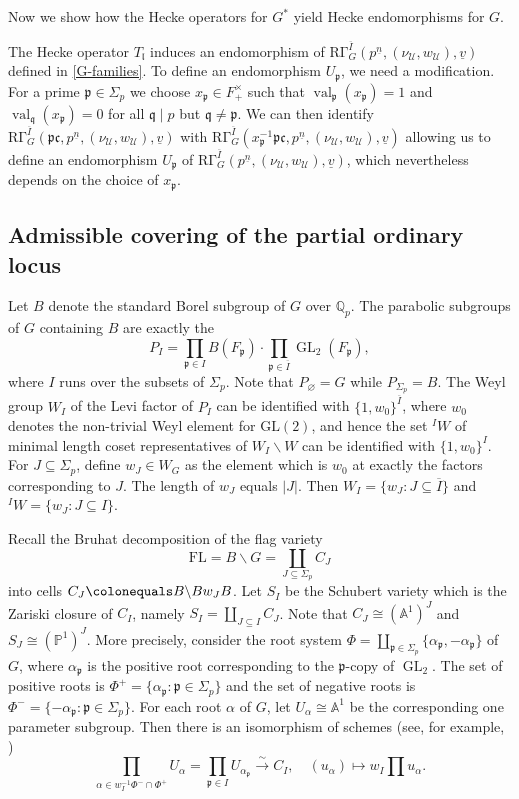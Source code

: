 \documentclass[11pt]{amsart}
\theoremstyle{definition} %
\theoremstyle{plain} %
\theoremstyle{remark} %
\renewcommand{\AA}{\mathbb A}
\newcommand{\PP}{{\mathbb P}}
\newcommand{\QQ}{{\mathbb Q}}
\newcommand{\cU}{{\mathcal U}}
\newcommand{\frakc}{\mathfrak c}
\newcommand{\frakl}{\mathfrak l}
\newcommand{\frakp}{\mathfrak p}
\newcommand{\frakq}{\mathfrak q}
\newcommand{\defeq}{\colonequals} %
\newcommand{\isom}{\cong} %
\DeclareMathOperator\GL{GL} %
\DeclareMathOperator\val{val} %
\newcommand{\RG}{\mathrm{R\Gamma}}
\begin{document}
Now we show how the Hecke operators for $G^\ast$ yield  Hecke endomorphisms for $G$.

The Hecke operator $T_\frakl$  induces an endomorphism of $\RG_G^{\overline{I}}(p^{\underline{n}},(\nu_\cU,w_\cU),\underline{v})$
defined in \eqref{G-families}. 
To define an  endomorphism $U_\frakp$, we need a modification.
For a prime $\frakp\in \Sigma_p$ we choose $x_\frakp\in F_+^{\times}$ such that $\val_\frakp(x_{\frakp})=1$ and $\val_\frakq(x_{\frakp})=0$ for all $\frakq\mid p$ but $\frakq\neq \frakp$.
We can then identify $\RG_G^{\overline{I}}(\frakp\frakc,p^{\underline{n}},(\nu_\cU,w_\cU),\underline{v})$ with $\RG_G^{\overline{I}}(x_{\frakp}^{-1}\frakp\frakc,p^{\underline{n}},(\nu_\cU,w_\cU),\underline{v})$ allowing us to define an endomorphism $U_\frakp$ of 
$\RG_G^{\overline{I}}(p^{\underline{n}},(\nu_\cU,w_\cU),\underline{v})$, which nevertheless depends on  the choice of $x_\frakp$.



\subsection{Admissible covering of the partial ordinary locus}
Let $B$ denote the standard Borel subgroup of $G$ over $\QQ_p$.  The parabolic subgroups of $G$ containing $B$ are exactly the 
\[P_I=\prod_{\frakp\in I} B(F_\frakp)\cdot \prod_{\frakp\in \overline{I}} \GL_2(F_\frakp),\]
where $I$ runs over the subsets of  $\Sigma_p$. Note that $P_{\varnothing}= G$ while $P_{\Sigma_p}= B$. 
The Weyl group $W_I$ of the Levi factor of  $P_I$ can be identified with $\{1,w_0\}^{\overline{I}}$, where $w_0$ denotes the non-trivial Weyl element for $\mathrm{GL}(2)$, and hence the set ${}^IW$ of minimal length coset representatives of  $W_I\backslash W$ can be identified with $\{1,w_0\}^{I}$. For $J\subseteq \Sigma_p$, define $w_J\in W_G$ as the element which is $w_0$ at exactly the factors corresponding to $J$. The length of $w_J$ equals $|J|$. 
Then $W_I=\{w_J\colon J\subseteq \overline{I}\}$ and ${}^I W = \{w_J\colon J\subseteq I\}$.


Recall the Bruhat decomposition of the flag variety 
\[\mathrm{FL} =B\backslash G=\coprod_{J\subseteq \Sigma_p}C_J\]
into cells $C_J\defeq B\backslash B w_J B$. 
Let $S_I$ be the Schubert variety which is the Zariski closure of $C_I$, namely $S_I = \coprod_{J\subseteq I} C_J$.
Note that   $C_J\isom (\AA^1)^J$ and $S_J \isom (\PP^1)^J$.
More precisely, consider the root system $\Phi=\coprod_{\frakp\in\Sigma_p}\{\alpha_\frakp, -\alpha_\frakp\}$ of $G$, where $\alpha_\frakp$ is the positive root corresponding to the $\frakp$-copy of $\GL_2$. 
The set of positive roots is $\Phi^+ = \{\alpha_\frakp\colon \frakp\in\Sigma_p\}$ and the set of negative roots is $\Phi^- = \{-\alpha_\frakp\colon \frakp\in\Sigma_p\}$.
For each root $\alpha$ of $G$, let $U_\alpha \isom \AA^1$  be the corresponding one parameter subgroup.
Then there is an isomorphism of schemes (see, for example,  \cite[Lem.~3.1.3]{BP})
\[
\prod_{\alpha\in w_I^{-1} \Phi^- \cap \Phi^+} {U_\alpha} = \prod_{\frakp\in I} {U_{\alpha_\frakp}} \xrightarrow\sim C_{I}, \quad (u_\alpha) \mapsto w_I\prod u_\alpha.
\]
\end{document}
